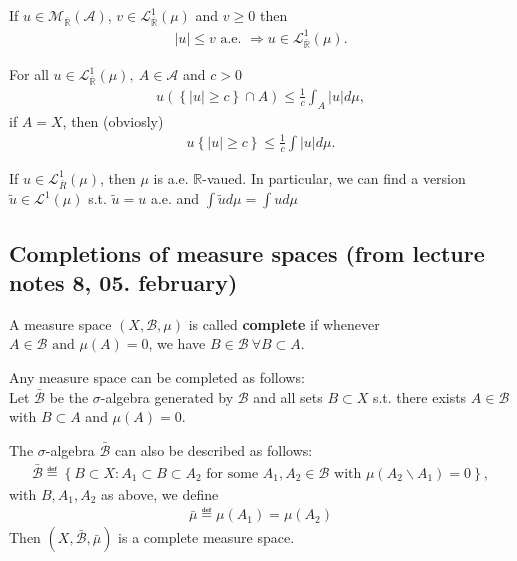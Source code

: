 \begin{corollary}
    If \(u\in\mathcal{M}_{\overline{\mathbb{R}}}(\mathscr{A})\), \(v\in\mathcal{L}^{1}_{\overline{\mathbb{R}}}(\mu)\) and \(v\geq0\) then
    \begin{align}
        \vert u\vert \leq v \text{ a.e. } \Rightarrow u\in\mathcal{L}^{1}_{\overline{\mathbb{R}}}(\mu).
    \end{align}
\end{corollary}
\begin{proposition}
    For all \(u\in\mathcal{L}^{1}_{\overline{\mathbb{R}}}(\mu), \ A\in\mathscr{A}\) and \(c>0\)
    \begin{align}
        u\left(\left\{ \vert u\vert \geq c \right\} \cap A\right) \leq \frac{1}{c}\int_{A}\vert u\vert d\mu,
    \end{align}
    if \(A=X\), then (obviosly)
    \begin{align}
        u\left\{ \vert u\vert \geq c \right\} \leq \frac{1}{c}\int \vert u\vert d\mu.
    \end{align}
\end{proposition}    
\ifdetailed
\begin{corollary}
    If \(u\in\mathcal{L}^{1}_{\overline{R}}(\mu)\), then \(\mu\) is a.e. \(\mathbb{R}\)-vaued. In particular, we can find a version
    \(\tilde{u}\in \mathcal{L}^{1}(\mu)\) s.t. \(\tilde{u}=u\) a.e. and \(\int\tilde{u}d\mu = \int ud\mu\)
\end{corollary}
\fi

\subsection*{Completions of measure spaces (from lecture notes 8, 05. february)}
\begin{definition}
    A measure space \(\left(X,\mathscr{B}, \mu\right)\) is called \textbf{complete} if whenever \(A\in\mathscr{B} \text{ and } \mu(A) =0\), we have \(B\in\mathscr{B} \ \forall B\subset A\).
\end{definition}
\begin{remark}
    Any measure space can be completed as follows: \\ 
    Let \(\bar{\mathscr{B}}\) be the \(\sigma\)-algebra generated by \(\mathscr{B}\) and all sets \(B\subset X\) s.t. there exists \(A\in\mathscr{B}\)
    with \(B\subset A\) and \(\mu(A)=0\).
\end{remark}
\begin{proposition}
    The \(\sigma\)-algebra \(\bar{\mathscr{B}}\) can also be described as follows:
    \begin{align}
        \bar{\mathscr{B}} \eqdef \left\{ B\subset X: A_1\subset B\subset A_2\text{ for some }A_1,A_2\in\mathscr{B}\text{ with }\mu(A_2\backslash A_1)=0 \right\},
    \end{align}
    with \(B,A_1,A_2 \) as above, we define 
    \begin{align}
        \bar{\mu} \eqdef \mu(A_1) = \mu(A_2)
    \end{align}
    Then \(\left( X,\bar{\mathscr{B}}, \bar{\mu} \right)\) is a complete measure space.
\end{proposition}

